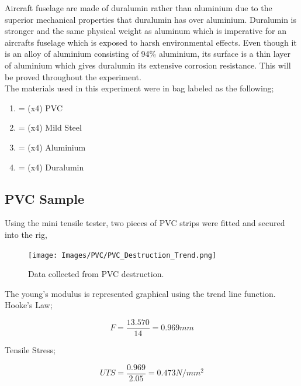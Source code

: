 \documentclass[11pt]{article}
\begin{document}
\begin{multicols}{2}
Aircraft fuselage are made of duralumin rather than aluminium due to the superior mechanical properties that duralumin has over aluminium. Duralumin is stronger and the same physical weight as aluminum which is imperative for an aircrafts fuselage which is exposed to harsh environmental effects. Even though it is an alloy of aluminium consisting of 94\% aluminium, its surface is a thin layer of aluminium which gives duralumin its extensive corrosion resistance. This will be proved throughout the experiment.\\

The materials used in this experiment were in bag labeled as the following; 

\begin{enumerate}[label=(Bag \Alph*)]
\centering
	\item{= (x4) PVC}
	\item{= (x4) Mild Steel}
    \item{= (x4) Aluminium}
    \item{= (x4) Duralumin}
\end{enumerate}


\subsection{PVC Sample}
\label{PVC Sample SubSection}

Using the mini tensile tester, two pieces of PVC strips were fitted and secured into the rig, 

\begin{figure}[H]
\centering
\texttt{[image: Images/PVC/PVC\_Destruction\_Trend.png]}
\caption{Data collected from PVC destruction.}
\label{PVC Destruction Trend}
\end{figure}

The young's modulus is represented graphical using the trend line function. \\

Hooke's Law;

\begin{equation}
{F = \dfrac{13.570}{14}=0.969mm}
\end{equation}

Tensile Stress;

\begin{equation}
{UTS = \dfrac{0.969}{2.05}=0.473N/mm^2}
\end{equation}


\end{multicols}
\end{document}
